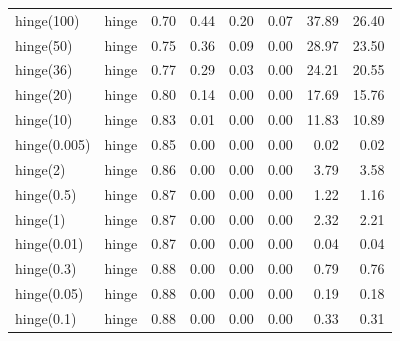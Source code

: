 \begin{tabular}{llrrrrrr}
    hinge(100) & hinge &      0.70 &         0.44 &         0.20 &          0.07 &         37.89 &          26.40 \\
     hinge(50) & hinge &      0.75 &         0.36 &         0.09 &          0.00 &         28.97 &          23.50 \\
     hinge(36) & hinge &      0.77 &         0.29 &         0.03 &          0.00 &         24.21 &          20.55 \\
     hinge(20) & hinge &      0.80 &         0.14 &         0.00 &          0.00 &         17.69 &          15.76 \\
     hinge(10) & hinge &      0.83 &         0.01 &         0.00 &          0.00 &         11.83 &          10.89 \\
  hinge(0.005) & hinge &      0.85 &         0.00 &         0.00 &          0.00 &          0.02 &           0.02 \\
      hinge(2) & hinge &      0.86 &         0.00 &         0.00 &          0.00 &          3.79 &           3.58 \\
    hinge(0.5) & hinge &      0.87 &         0.00 &         0.00 &          0.00 &          1.22 &           1.16 \\
      hinge(1) & hinge &      0.87 &         0.00 &         0.00 &          0.00 &          2.32 &           2.21 \\
   hinge(0.01) & hinge &      0.87 &         0.00 &         0.00 &          0.00 &          0.04 &           0.04 \\
    hinge(0.3) & hinge &      0.88 &         0.00 &         0.00 &          0.00 &          0.79 &           0.76 \\
   hinge(0.05) & hinge &      0.88 &         0.00 &         0.00 &          0.00 &          0.19 &           0.18 \\
    hinge(0.1) & hinge &      0.88 &         0.00 &         0.00 &          0.00 &          0.33 &           0.31 \\
\hline
\end{tabular}
